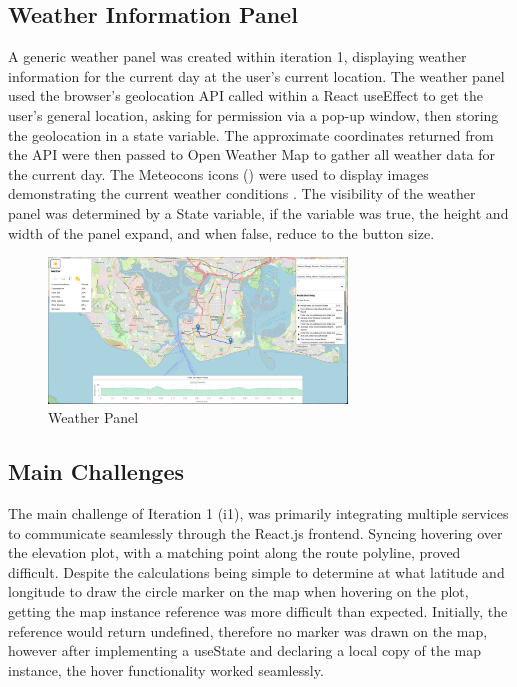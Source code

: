 \subsection{Weather Information Panel}
\label{iteration1:weather-panel}
A generic weather panel was created within iteration 1, displaying weather information for the current day at the user's current location. The weather panel used the browser's geolocation API called within a React useEffect to get the user's general location, asking for permission via a pop-up window, then storing the geolocation in a state variable. The approximate coordinates returned from the API were then passed to Open Weather Map to gather all weather data for the current day. The Meteocons icons (\cite{noauthor_weather_nodate}) were used to display images demonstrating the current weather conditions . The visibility of the weather panel was determined by a State variable, if the variable was true, the height and width of the panel expand, and when false, reduce to the button size.

\begin{figure}[!ht]
    \centering
    \includegraphics[width=300px]{figures/Progress Images/Iteration-1/SR19&SR28 Combined/SR19&SR28 Merged.png}
    \caption{Weather Panel}
    \label{fig:basic-weather-panel}
\end{figure}

\subsection{Main Challenges}
\label{iteration1:main-challenges}
The main challenge of Iteration 1 (i1), was primarily integrating multiple services to communicate seamlessly through the React.js frontend. Syncing hovering over the elevation plot, with a matching point along the route polyline, proved difficult. Despite the calculations being simple to determine at what latitude and longitude to draw the circle marker on the map when hovering on the plot, getting the map instance reference was more difficult than expected. Initially, the reference would return undefined, therefore no marker was drawn on the map, however after implementing a useState and declaring a local copy of the map instance, the hover functionality worked seamlessly.

